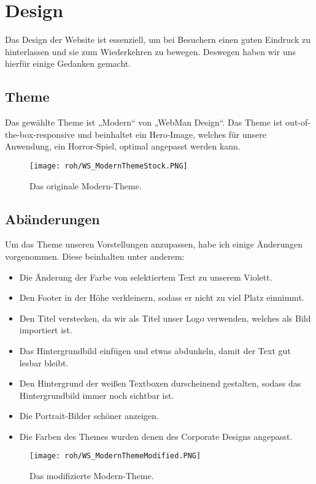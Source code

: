 \section{Design}
Das Design der Website ist essenziell, um bei Besuchern einen guten Eindruck zu hinterlassen und sie zum Wiederkehren zu bewegen. Deswegen haben wir uns hierfür einige Gedanken gemacht.
\subsection{Theme}
Das gewählte Theme ist „Modern“ von „WebMan Design“. Das Theme ist out-of-the-box-responsive und beinhaltet ein Hero-Image, welches für unsere Anwendung, ein Horror-Spiel, optimal angepasst werden kann. \citep{website:Theme}
\begin{figure}[H]
    \centering
    \texttt{[image: roh/WS\_ModernThemeStock.PNG]}
    \caption{Das originale Modern-Theme.}
    \label{WS:ModerThemeStock}
\end{figure}

\subsection{Abänderungen}
Um das Theme unseren Vorstellungen anzupassen, habe ich einige Änderungen vorgenommen. Diese beinhalten unter anderem:
\begin{itemize}
    \item Die Änderung der Farbe von selektiertem Text zu unserem Violett.
    \item Den Footer in der Höhe verkleinern, sodass er nicht zu viel Platz einnimmt.
    \item Den Titel verstecken, da wir als Titel unser Logo verwenden, welches als Bild importiert ist.
    \item Das Hintergrundbild einfügen und etwas abdunkeln, damit der Text gut lesbar bleibt.
    \item Den Hintergrund der weißen Textboxen durscheinend gestalten, sodass das Hintergrundbild immer noch sichtbar ist.
    \item Die Portrait-Bilder schöner anzeigen.
    \item Die Farben des Themes wurden denen des Corporate Designs angepasst.
\end{itemize}
\begin{figure}[H]
    \centering
    \texttt{[image: roh/WS\_ModernThemeModified.PNG]}
    \caption{Das modifizierte Modern-Theme.}
    \label{WS:ModerThemeModified}
\end{figure}
